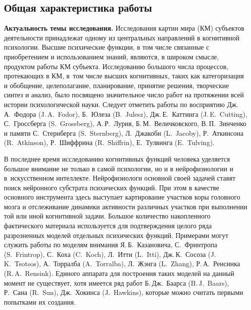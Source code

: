 \subsection*{\Large Общая характеристика работы}
\fontsize{14pt}{15pt}\selectfont

\textbf{Актуальность темы исследования.} Исследования картин мира (КМ) субъектов деятельности принадлежат одному из центральных направлений в когнитивной психологии. Высшие психические функции, в том числе связанные с приобретением и использованием знаний, являются, в широком смысле, продуктом работы КМ субъекта. Исследованию большого числа процессов, протекающих в КМ, в~том числе высших когнитивных, таких как категоризация и обобщение, целеполагание, планирование, принятие решения, творческие синтез и анализ, было посвящено значительное число работ на протяжении всей истории психологической науки. Следует отметить работы по восприятию Дж.\,А.~Фодора (J.\,A.~Fodor), Б.~Юлеза (B.~Julesz), Дж.\,Е.~Каттинга (J.\,E.~Cutting), С.~Гроссберга (S.~Grossberg), А.\,Р.~Лурия, Б.\,М.~Величковского, В.\,П.~Зинченко и памяти С.~Стернберга (S.~Sternberg), Л.~Джакоби (L.~Jacoby), Р.~Аткинсона (R.~Atkinson), Р.~Шиффрина (R.~Shiffrin), Е.~Тулвинга (E.~Tulving).

В последнее время исследованию когнитивных функций человека уделяется большое внимание не только в самой психологии, но и в нейрофизиологии и в~искусственном интеллекте. Нейрофизиологи основной своей задачей ставят поиск нейронного субстрата психических функций. При этом в качестве основного инструмента здесь выступает картирование участков коры головного мозга и отслеживание динамики активности различных участков при выполнении той или иной когнитивной задачи. Большое количество накопленного фактического материала используется для подтверждения целого ряда разрозненных моделей отдельных психических функций. Примерами могут служить работы по моделям внимания Я.\,Б.~Казановича, С.~Фринтропа (S.~Frintrop), С.~Коха (C.~Koch), Л.~Итти (L.~Itti), Дж.\,К.~Сосоза (J.\,K.~Tsotsos), А.~Торралба (A.~Torralba), Л.~Жэнга (L.~Zhang), Р.\,А.~Ренсинка (R.\,A.~Rensink). Единого аппарата для построения таких моделей на данный момент не существует, хотя имеется ряд работ Б.\,Дж.~Баарса (B.\,J.~Baars), Р.~Сана (R.~Sun), Дж.~Хокинса (J.~Hawkins), которые можно считать первыми попытками их создания.

